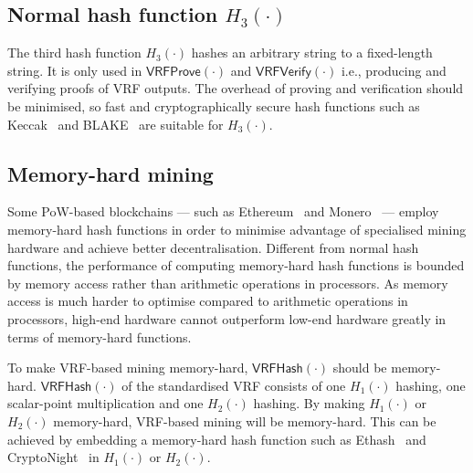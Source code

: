 \subsection{Normal hash function $H_{3}(\cdot)$}
The third hash function $H_{3}(\cdot)$ hashes an arbitrary string to a fixed-length string.
It is only used in $\mathsf{VRFProve}(\cdot)$ and $\mathsf{VRFVerify}(\cdot)$ i.e., producing and verifying proofs of VRF outputs.
The overhead of proving and verification should be minimised, so fast and cryptographically secure hash functions such as Keccak~\cite{bertoni2013keccak} and BLAKE~\cite{aumasson2008sha} are suitable for $H_{3}(\cdot)$.


\subsection{Memory-hard mining}
Some PoW-based blockchains --- such as Ethereum~\cite{wood2014ethereum} and Monero~\cite{monero} --- employ memory-hard hash functions in order to minimise advantage of specialised mining hardware and achieve better decentralisation.
Different from normal hash functions, the performance of computing memory-hard hash functions is bounded by memory access rather than arithmetic operations in processors.
As memory access is much harder to optimise compared to arithmetic operations in processors, high-end hardware cannot outperform low-end hardware greatly in terms of memory-hard functions.

To make VRF-based mining memory-hard, $\mathsf{VRFHash}(\cdot)$ should be memory-hard.
$\mathsf{VRFHash}(\cdot)$ of the standardised VRF consists of one $H_{1}(\cdot)$ hashing, one scalar-point multiplication and one $H_{2}(\cdot)$ hashing.
By making $H_{1}(\cdot)$ or $H_{2}(\cdot)$ memory-hard, VRF-based mining will be memory-hard.
This can be achieved by embedding a memory-hard hash function such as Ethash~\cite{wiki2017ethash} and CryptoNight~\cite{seigenneocortex} in $H_1(\cdot)$ or $H_2(\cdot)$.